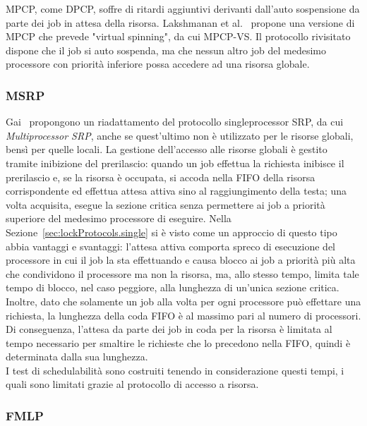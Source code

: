 MPCP, come DPCP, soffre di ritardi aggiuntivi derivanti dall'auto sospensione da parte dei job in attesa della risorsa. Lakshmanan et al.~\cite{5368127} propone una versione di MPCP che prevede "virtual spinning", da cui MPCP-VS. Il protocollo rivisitato dispone che il job si auto sospenda, ma che nessun altro job del medesimo processore con priorità inferiore possa accedere ad una risorsa globale.\\

\subsubsection{MSRP}
\label{sec:lockProtocols.msrp}

Gai~\cite{Gai:2003:CMM:827266.828537} propongono un riadattamento del protocollo singleprocessor SRP, da cui \textit{Multiprocessor SRP}, anche se quest'ultimo non è utilizzato per le risorse globali, bensì per quelle locali. La gestione dell'accesso alle risorse globali è gestito tramite inibizione del prerilascio: quando un job effettua la richiesta inibisce il prerilascio e, se la risorsa è occupata, si accoda nella FIFO della risorsa corrispondente ed effettua attesa attiva sino al raggiungimento della testa; una volta acquisita, esegue la sezione critica senza permettere ai job a priorità superiore del medesimo processore di eseguire. Nella Sezione~\ref{sec:lockProtocols.single} si è visto come un approccio di questo tipo abbia vantaggi e svantaggi: l'attesa attiva comporta spreco di esecuzione del processore in cui il job la sta effettuando e causa blocco ai job a priorità più alta che condividono il processore ma non la risorsa, ma, allo stesso tempo, limita tale tempo di blocco, nel caso peggiore, alla lunghezza di un'unica sezione critica. Inoltre, dato che solamente un job alla volta per ogni processore può effettare una richiesta, la lunghezza della coda FIFO è al massimo pari al numero di processori. Di conseguenza, l'attesa da parte dei job in coda per la risorsa è limitata al tempo necessario per smaltire le richieste che lo precedono nella FIFO, quindi è determinata dalla sua lunghezza.\\
I test di schedulabilità sono costruiti tenendo in considerazione questi tempi, i quali sono limitati grazie al protocollo di accesso a risorsa.

\subsubsection{FMLP}
\label{sec:lockProtocols.fmlp}

